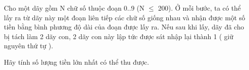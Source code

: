 Cho một dãy gồm N chữ số thuộc đoạn 0..9 (N $\le$ 200). Ở mỗi bước, ta có thể lấy ra từ dãy này một đoạn liên tiếp các chữ số giống nhau và nhận được một số tiền bằng bình phương độ dài của đoạn được lấy ra. Nếu sau khi lấy, dãy đã cho bị tách làm 2 dãy con, 2 dãy con này lập tức được sát nhập lại thành 1 ( giữ nguyên thứ tự ).   


   Hãy tính số lượng tiền lớn nhất có thể thu được.
